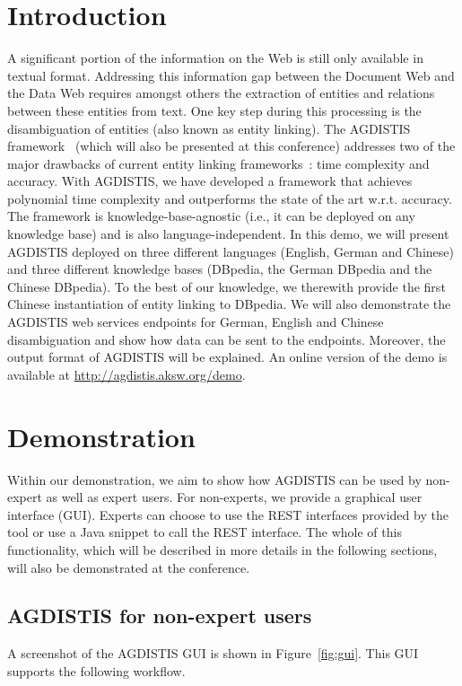 \documentclass{llncs}
\begin{document}
\section{Introduction}
A significant portion of the information on the Web is still only available in textual format. 
Addressing this information gap between the Document Web and the Data Web requires amongst others the extraction of entities and relations between these entities from text.
One key step during this processing is the disambiguation of entities (also known as entity linking).
The AGDISTIS framework~\cite{AGDISTIS_ISWC} (which will also be presented at this conference) addresses two of the major drawbacks of current entity linking frameworks~\cite{TagMe2,spotlight,babelfy}: time complexity and accuracy.
With AGDISTIS, we have developed a framework that achieves polynomial time complexity and outperforms the state of the art w.r.t. accuracy.
The framework is knowledge-base-agnostic (i.e., it can be deployed on any knowledge base) and is also language-independent.
In this demo, we will present AGDISTIS deployed on three different languages (English, German and Chinese) and three different knowledge bases (DBpedia, the German DBpedia and the Chinese DBpedia).
To the best of our knowledge, we therewith provide the first Chinese instantiation of entity linking to DBpedia.
We will also demonstrate the AGDISTIS web services endpoints for German, English and Chinese disambiguation and show how data can be sent to the endpoints.
Moreover, the output format of AGDISTIS will be explained.
An online version of the demo is available at \url{http://agdistis.aksw.org/demo}.

 
 
\section{Demonstration}
Within our demonstration, we aim to show how AGDISTIS can be used by non-expert as well as expert users.
For non-experts, we provide a graphical user interface (GUI).
Experts can choose to use the REST interfaces provided by the tool or use a Java snippet to call the REST interface.
The whole of this functionality, which will be described in more details in the following sections, will also be demonstrated at the conference.

\subsection{AGDISTIS for non-expert users}
A screenshot of the AGDISTIS GUI is shown in Figure~\ref{fig:gui}.
This GUI supports the following workflow.
\end{document}
